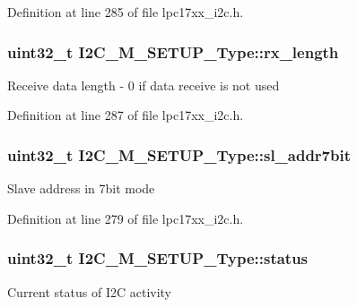 \-Definition at line 285 of file lpc17xx\-\_\-i2c.\-h.

\hypertarget{struct_i2_c___m___s_e_t_u_p___type_a9bbc3df52a3571f128b818e38b9ce96f}{
\subsubsection[{rx\-\_\-length}]{\setlength{\rightskip}{0pt plus 5cm}uint32\-\_\-t {\bf \-I2\-C\-\_\-\-M\-\_\-\-S\-E\-T\-U\-P\-\_\-\-Type\-::rx\-\_\-length}}}\label{struct_i2_c___m___s_e_t_u_p___type_a9bbc3df52a3571f128b818e38b9ce96f}
\-Receive data length -\/ 0 if data receive is not used 

\-Definition at line 287 of file lpc17xx\-\_\-i2c.\-h.

\hypertarget{struct_i2_c___m___s_e_t_u_p___type_a369581824a6baea2ab236b32d3d51062}{
\subsubsection[{sl\-\_\-addr7bit}]{\setlength{\rightskip}{0pt plus 5cm}uint32\-\_\-t {\bf \-I2\-C\-\_\-\-M\-\_\-\-S\-E\-T\-U\-P\-\_\-\-Type\-::sl\-\_\-addr7bit}}}\label{struct_i2_c___m___s_e_t_u_p___type_a369581824a6baea2ab236b32d3d51062}
\-Slave address in 7bit mode 

\-Definition at line 279 of file lpc17xx\-\_\-i2c.\-h.

\hypertarget{struct_i2_c___m___s_e_t_u_p___type_aee964d65fc6f579feedcd276b833777f}{
\subsubsection[{status}]{\setlength{\rightskip}{0pt plus 5cm}uint32\-\_\-t {\bf \-I2\-C\-\_\-\-M\-\_\-\-S\-E\-T\-U\-P\-\_\-\-Type\-::status}}}\label{struct_i2_c___m___s_e_t_u_p___type_aee964d65fc6f579feedcd276b833777f}
\-Current status of \-I2\-C activity 

